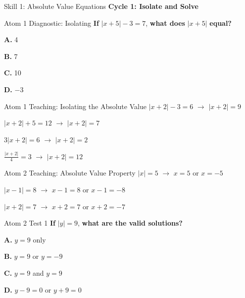 \documentclass[12pt]{beamer}
\begin{document}
\begin{frame}{Skill 1: Absolute Value Equations}
\Large
\textbf{Cycle 1: Isolate and Solve}
\end{frame}

\begin{frame}{Atom 1 Diagnostic: Isolating}
\textbf{If} $|x + 5| - 3 = 7$, \textbf{what does} $|x + 5|$ \textbf{equal?}

\vspace{1cm}

\textbf{A.} 4

\textbf{B.} 7

\textbf{C.} 10 \hfill {}

\textbf{D.} $-3$
\end{frame}

\begin{frame}{Atom 1 Teaching: Isolating the Absolute Value}
$|x + 2| - 3 = 6$ \pause $\rightarrow$ $|x + 2| = 9$

\pause
\vspace{0.5cm}

$|x + 2| + 5 = 12$ \pause $\rightarrow$ $|x + 2| = 7$

\pause
\vspace{0.5cm}

$3|x + 2| = 6$ \pause $\rightarrow$ $|x + 2| = 2$

\pause
\vspace{0.5cm}

$\displaystyle\frac{|x + 2|}{4} = 3$ \pause $\rightarrow$ $|x + 2| = 12$
\end{frame}

\begin{frame}{Atom 2 Teaching: Absolute Value Property}
$|x| = 5$ \pause $\rightarrow$ $x = 5$ or $x = -5$

\pause
\vspace{0.5cm}

$|x - 1| = 8$ \pause $\rightarrow$ $x - 1 = 8$ or $x - 1 = -8$

\pause
\vspace{0.5cm}

$|x + 2| = 7$ \pause $\rightarrow$ $x + 2 = 7$ or $x + 2 = -7$
\end{frame}

\begin{frame}{Atom 2 Test 1}
\textbf{If} $|y| = 9$, \textbf{what are the valid solutions?}

\vspace{1cm}

\textbf{A.} $y = 9$ only

\textbf{B.} $y = 9$ or $y = -9$ \hfill {}

\textbf{C.} $y = 9$ and $y = 9$

\textbf{D.} $y - 9 = 0$ or $y + 9 = 0$
\end{frame}
\end{document}
